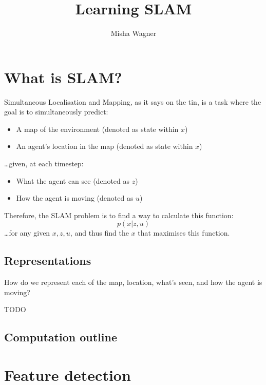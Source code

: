 \documentclass{article}
\title{Learning SLAM}
\author{Misha Wagner}
\begin{document}
\maketitle
{}

\section{What is SLAM?}

Simultaneous Localisation and Mapping, as it says on the tin, is a task where
the goal is to simultaneously predict:
\begin{itemize}
  \item A map of the environment (denoted as state within $x$)
  \item An agent's location in the map (denoted as state within $x$)
\end{itemize}
\dots given, at each timestep:
\begin{itemize}
  \item What the agent can see (denoted as $z$)
  \item How the agent is moving (denoted as $u$)
\end{itemize}

Therefore, the SLAM problem is to find a way to calculate this function:
\begin{equation}\label{slam}
  p(x \vert z, u)
\end{equation}
\dots for any given $x, z, u$, and thus find the $x$ that maximises this
function.

\subsection{Representations}

How do we represent each of the map, location, what's seen, and how the agent
is moving?

TODO

\subsection{Computation outline}

\section{Feature detection}
\end{document}
